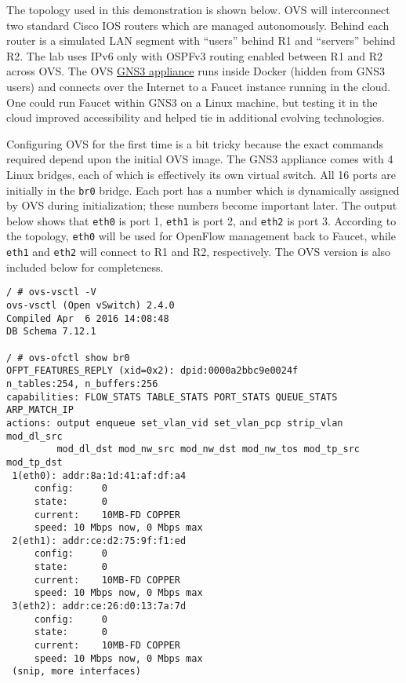 The topology used in this demonstration is shown below. OVS will interconnect
two standard Cisco IOS routers which are managed autonomously. Behind
each router is a simulated LAN segment with ``users'' behind R1 and
``servers'' behind R2. The lab uses IPv6 only with OSPFv3 routing
enabled between R1 and R2 across OVS\@. The OVS
\href{https://gns3.com/marketplace/appliances/open-vswitch}{GNS3 appliance}
runs inside Docker (hidden from GNS3 users) and connects over the Internet
to a Faucet instance running in the cloud. One could run Faucet within
GNS3 on a Linux machine, but testing it in the cloud improved
accessibility and helped tie in additional evolving technologies.


Configuring OVS for the first time is a bit tricky because the
exact commands required depend upon the initial OVS image. The
GNS3 appliance comes with 4 Linux bridges, each of which is effectively
its own virtual switch. All 16 ports are initially in the \verb|br0| bridge.
Each port has a number which is dynamically assigned by OVS during
initialization; these numbers become important later. The output
below shows that \verb|eth0| is port 1, \verb|eth1| is port 2,
and \verb|eth2| is port 3. According to the topology, \verb|eth0| will
be used for OpenFlow management back to Faucet, while \verb|eth1| and
\verb|eth2| will connect to R1 and R2, respectively. The OVS version
is also included below for completeness.

\begin{verbatim}
/ # ovs-vsctl -V
ovs-vsctl (Open vSwitch) 2.4.0
Compiled Apr  6 2016 14:08:48
DB Schema 7.12.1

/ # ovs-ofctl show br0
OFPT_FEATURES_REPLY (xid=0x2): dpid:0000a2bbc9e0024f
n_tables:254, n_buffers:256
capabilities: FLOW_STATS TABLE_STATS PORT_STATS QUEUE_STATS ARP_MATCH_IP
actions: output enqueue set_vlan_vid set_vlan_pcp strip_vlan mod_dl_src 
         mod_dl_dst mod_nw_src mod_nw_dst mod_nw_tos mod_tp_src mod_tp_dst
 1(eth0): addr:8a:1d:41:af:df:a4
     config:     0
     state:      0
     current:    10MB-FD COPPER
     speed: 10 Mbps now, 0 Mbps max
 2(eth1): addr:ce:d2:75:9f:f1:ed
     config:     0
     state:      0
     current:    10MB-FD COPPER
     speed: 10 Mbps now, 0 Mbps max
 3(eth2): addr:ce:26:d0:13:7a:7d
     config:     0
     state:      0
     current:    10MB-FD COPPER
     speed: 10 Mbps now, 0 Mbps max
 (snip, more interfaces)
\end{verbatim}

